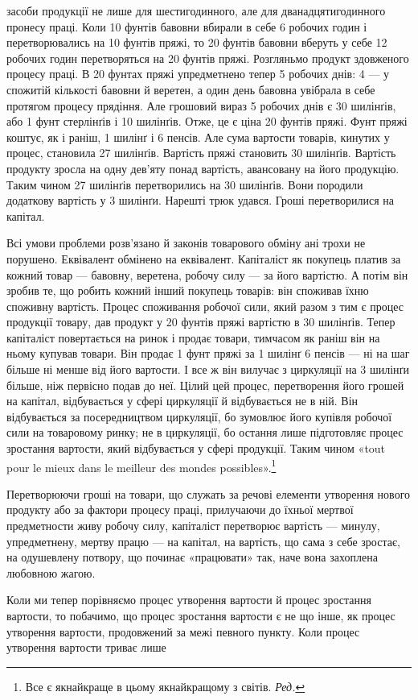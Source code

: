 \parcont{}  %
засоби продукції не лише для шестигодинного, але для дванадцятигодинного
пронесу праці. Коли 10 фунтів бавовни вбирали
в себе 6 робочих годин і перетворювались на 10 фунтів пряжі, то
20 фунтів бавовни вберуть у себе 12 робочих годин  перетворяться
на 20 фунтів пряжі. Розгляньмо продукт здовженого процесу
праці. В 20 фунтах пряжі упредметнено тепер 5 робочих днів:
4 — у спожитій кількості бавовни й веретен, а один день бавовна
увібрала в себе протягом процесу прядіння. Але грошовий вираз
5 робочих днів є 30 шилінґів, або 1 фунт стерлінґів і 10 шилінґів.
Отже, це є ціна 20 фунтів пряжі. Фунт пряжі коштує, як і
раніш, 1 шилінґ і 6 пенсів. Але сума вартости товарів, кинутих у
процес, становила 27 шилінґів. Вартість пряжі становить 30 шилінґів.
Вартість продукту зросла на одну дев’яту понад вартість,
авансовану на його продукцію. Таким чином 27 шилінґів перетворились
на 30 шилінґів. Вони породили додаткову вартість
у 3 шилінґи. Нарешті трюк удався. Гроші перетворилися
на капітал.

Всі умови проблеми розв’язано й законів товарового обміну
ані трохи не порушено. Еквівалент обмінено на еквівалент.
Капіталіст як покупець платив за кожний товар — бавовну,
веретена, робочу силу — за його вартістю. А потім він зробив
те, що робить кожний інший покупець товарів: він споживав
їхню споживну вартість. Процес споживання робочої сили, який
разом з тим є процес продукції товару, дав продукт у 20 фунтів
пряжі вартістю в 30 шилінґів. Тепер капіталіст повертається
на ринок і продає товари, тимчасом як раніш він на ньому
купував товари. Він продає 1 фунт пряжі за 1 шилінґ 6 пенсів —
ні на шаг більше ні менше від його вартости. І все ж він вилучає
з циркуляції на 3 шилінґи більше, ніж первісно подав до неї.
Цілий цей процес, перетворення його грошей на капітал, відбувається
у сфері циркуляції й відбувається не в ній. Він відбувається
за посередництвом циркуляції, бо зумовлює його купівля
робочої сили на товаровому ринку; не в циркуляції, бо остання
лише підготовляє процес зростання вартости, який відбувається
у сфері продукції. Таким чином «tout pour le mieux dans le meilleur
des mondes possibles».\footnote*{
Все є якнайкраще в цьому якнайкращому з світів. \emph{Ред.}
}

Перетворюючи гроші на товари, що служать за речові
елементи утворення нового продукту або за фактори процесу
праці, прилучаючи до їхньої мертвої предметности живу робочу
силу, капіталіст перетворює вартість — минулу, упредметнену,
мертву працю — на капітал, на вартість, що сама з себе зростає,
на одушевлену потвору, що починає «працювати» так, наче вона
захоплена любовною жагою.

Коли ми тепер порівняємо процес утворення вартости й процес
зростання вартости, то побачимо, що процес зростання вартости є
не що інше, як процес утворення вартости, продовжений за межі
певного пункту. Коли процес утворення вартости триває лише
\parbreak{}  %
